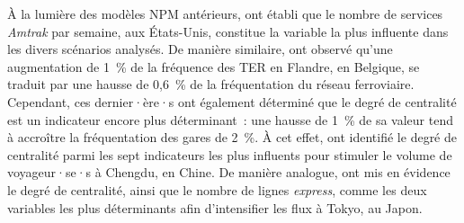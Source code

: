 \begin{refsegment}

À la lumière des modèles \acrshort{NPM} antérieurs, \textcolor{blue}{\textcite[8]{cummings_does_2022}} ont établi que le nombre de services \textsl{Amtrak} par semaine, aux États-Unis, constitue la variable la plus influente dans les divers scénarios analysés. De manière similaire, \textcolor{blue}{\textcite[5]{caset_integrating_2020}} ont observé qu'une augmentation de 1~\% de la fréquence des \acrshort{TER} en Flandre, en Belgique, se traduit par une hausse de 0,6~\% de la fréquentation du réseau ferroviaire. Cependant, ces dernier·ère·s ont également déterminé que le degré de centralité est un indicateur encore plus déterminant~: une hausse de 1~\% de sa valeur tend à accroître la fréquentation des gares de 2~\%. À cet effet, \textcolor{blue}{\textcite[11]{amini_pishro_node_2022}} ont identifié le degré de centralité parmi les sept indicateurs les plus influents pour stimuler le volume de voyageur·se·s à Chengdu, en Chine. De manière analogue, \textcolor{blue}{\textcite[9]{cao_coordination_2020}} ont mis en évidence le degré de centralité, ainsi que le nombre de lignes \textsl{express}, comme les deux variables les plus déterminants afin d'intensifier les flux à Tokyo, au Japon.%


\end{refsegment}
